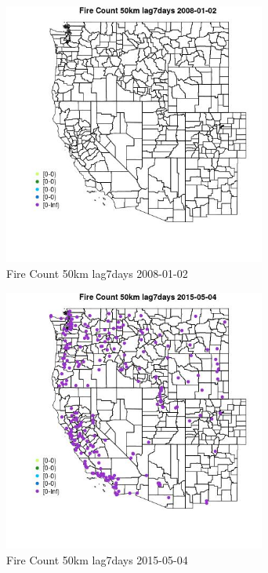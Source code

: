 \begin{figure} 
\centering  
\includegraphics[width=0.77\textwidth]{Code_Outputs/Report_ML_input_PM25_Step4_part_e_de_duplicated_aves_compiled_2019-05-18wNAs_MapObsFire_Count_50km_lag7days2008-01-02.jpg} 
\caption{\label{fig:Report_ML_input_PM25_Step4_part_e_de_duplicated_aves_compiled_2019-05-18wNAsMapObsFire_Count_50km_lag7days2008-01-02}Fire Count 50km lag7days 2008-01-02} 
\end{figure} 
 

\begin{figure} 
\centering  
\includegraphics[width=0.77\textwidth]{Code_Outputs/Report_ML_input_PM25_Step4_part_e_de_duplicated_aves_compiled_2019-05-18wNAs_MapObsFire_Count_50km_lag7days2015-05-04.jpg} 
\caption{\label{fig:Report_ML_input_PM25_Step4_part_e_de_duplicated_aves_compiled_2019-05-18wNAsMapObsFire_Count_50km_lag7days2015-05-04}Fire Count 50km lag7days 2015-05-04} 
\end{figure} 
 

